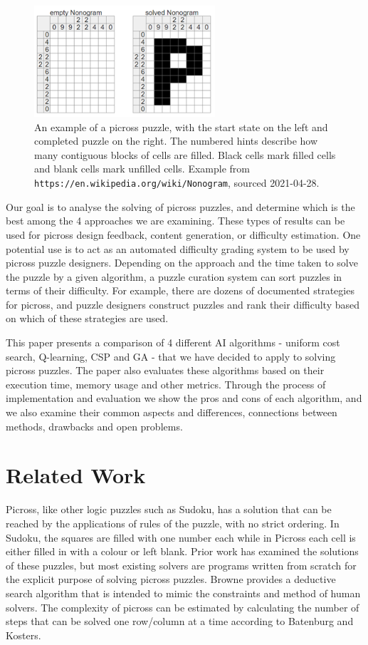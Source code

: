 \documentclass{svproc}
\begin{document}
\begin{figure}[h]
  \centering
  \includegraphics[width=0.6\textwidth]{picross1.png}
  \caption{An example of a picross puzzle, with the start state on the left and completed puzzle on the right. The numbered hints describe how many contiguous blocks of cells are filled. Black cells mark filled cells and blank cells mark unfilled cells. Example from \texttt{https://en.wikipedia.org/wiki/Nonogram}, sourced 2021-04-28.}
\end{figure}

Our goal is to analyse the solving of picross puzzles, and determine which is the best among the 4 approaches we are examining. These types of results can be used for picross design feedback, content generation, or difficulty estimation.
One potential use is to act as an automated difficulty grading system to be used by picross puzzle designers. Depending on the approach and the time taken to solve the puzzle by a given algorithm, a puzzle curation system can sort puzzles in terms of their difficulty.
For example, there are dozens of documented strategies for picross\cite{picross1}, and puzzle designers construct puzzles and rank their difficulty based on which of these strategies are used\cite{picross2}.

This paper presents a comparison of 4 different AI algorithms - uniform cost search, Q-learning, CSP and GA - that we  have decided to apply to solving picross puzzles.
The paper also evaluates these algorithms based on their execution time, memory usage and other metrics.
Through the process of implementation and evaluation we show the pros and cons of each algorithm, and we also examine their common aspects and differences, connections between methods, drawbacks and open problems.


\section{Related Work}
Picross, like other logic puzzles such as Sudoku, has a solution that can be reached by the applications of rules of the puzzle, with no strict ordering.
In Sudoku, the squares are filled with one number each while in Picross each cell is either filled in with a colour or left blank.
Prior work has examined the solutions of these puzzles, but most existing solvers are programs written from scratch for the explicit purpose of solving picross puzzles\cite{5.1.1,5.1.2,5.1.3,5.1.7}.
Browne provides a deductive search algorithm that is intended to mimic the constraints and method of human solvers\cite{Browne}.
The complexity of picross can be estimated by calculating the number of steps that can be solved one row/column at a time according to Batenburg and Kosters\cite{Batenburg and Kosters}.
\end{document}
